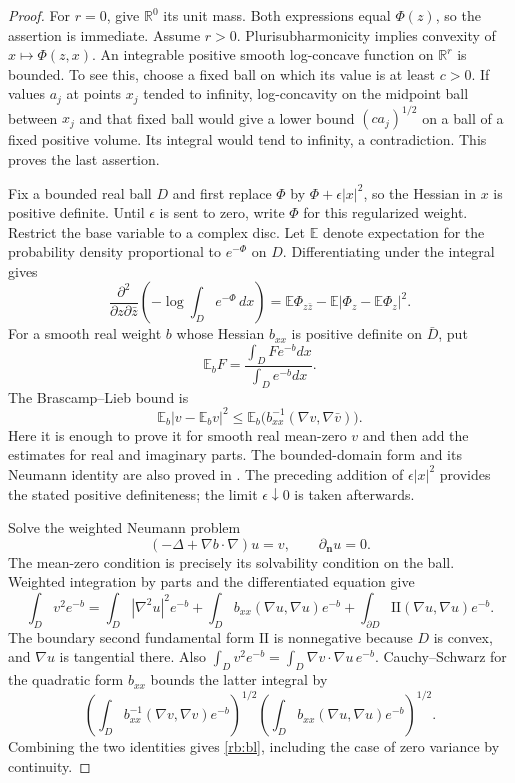 \begin{proof}
For $r=0$, give $\mathbb R^0$ its unit mass. Both expressions equal $\Phi(z)$, so the assertion is immediate. Assume $r>0$.
Plurisubharmonicity implies convexity of $x\mapsto\Phi(z,x)$.
An integrable positive smooth log-concave function on $\mathbb R^r$
is bounded.  To see this, choose a fixed ball on which its value is at
least $c>0$.  If values $a_j$ at points $x_j$ tended to infinity,
log-concavity on the midpoint ball between $x_j$ and that fixed ball
would give a lower bound $(ca_j)^{1/2}$ on a ball of a fixed positive
volume.  Its integral would tend to infinity, a contradiction.
This proves the last assertion.

Fix a bounded real ball $D$ and first replace $\Phi$ by
$\Phi+\epsilon|x|^2$, so the Hessian in $x$ is positive definite. Until $\epsilon$ is sent to zero,
write $\Phi$ for this regularized weight. Restrict the base variable to a complex disc.  Let $\mathbb E$ denote
expectation for the probability density proportional to $e^{-\Phi}$
on $D$.  Differentiating under the integral gives
\begin{equation}\label{rb:variance}
 \frac{\partial^2}{\partial z\partial\bar z}
          \left(-\log\int_D e^{-\Phi}\,dx\right)
   =\mathbb E\Phi_{z\bar z}
       -\mathbb E|\Phi_z-\mathbb E\Phi_z|^2.
\end{equation}
For a smooth real weight $b$ whose Hessian $b_{xx}$ is positive definite
on $\bar D$, put
\[\mathbb E_b F=\frac{\int_D F e^{-b}dx}{\int_D e^{-b}dx}.\]
The Brascamp--Lieb bound is
\begin{equation}\label{rb:bl}
 \mathbb E_b|v-\mathbb E_bv|^2
       \leq\mathbb E_b\bigl(b_{xx}^{-1}(\nabla v,\nabla\bar v)\bigr).
\end{equation}
Here it is enough to prove it for smooth real mean-zero $v$ and then
add the estimates for real and imaginary parts. The bounded-domain
form and its Neumann identity are also proved in
\cite[Theorems~1.1 and~1.2(1), and Section~3.3]{KolesnikovMilman2017}.
The preceding addition of \(\epsilon|x|^2\) provides the stated positive
definiteness; the limit \(\epsilon\downarrow0\) is taken afterwards.

Solve the weighted Neumann problem
\[
             (-\Delta+\nabla b\cdot\nabla)u=v,
             \qquad \partial_{\mathbf n}u=0.
\]
The mean-zero condition is precisely its solvability condition on the
ball.  Weighted integration by parts and the differentiated equation
give
\[
 \int_Dv^2e^{-b}
  =\int_D|\nabla^2u|^2e^{-b}
     +\int_Db_{xx}(\nabla u,\nabla u)e^{-b}
     +\int_{\partial D}\mathrm{II}(\nabla u,\nabla u)e^{-b}.
\]
The boundary second fundamental form $\mathrm{II}$ is nonnegative
because $D$ is convex, and $\nabla u$ is tangential there.  Also
$\int_Dv^2e^{-b}=\int_D\nabla v\cdot\nabla u\,e^{-b}$.
Cauchy--Schwarz for the quadratic form $b_{xx}$ bounds the latter
integral by
\[
 \left(\int_Db_{xx}^{-1}(\nabla v,\nabla v)e^{-b}\right)^{1/2}
 \left(\int_Db_{xx}(\nabla u,\nabla u)e^{-b}\right)^{1/2}.
\]
Combining the two identities gives \eqref{rb:bl}, including the case
of zero variance by continuity.


\end{proof}
